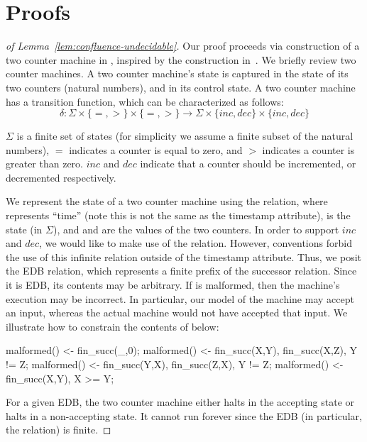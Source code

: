 \section{Proofs}
\begin{proof}[of Lemma~\ref{lem:confluence-undecidable}]
Our proof proceeds via construction of a two counter machine in \lang, inspired by the construction in~\cite{undecidable-datalog}. We briefly review two counter machines.  A two counter machine's state is captured in the state of its two counters (natural numbers), and in its control state.  A two counter machine has a transition function, which can be characterized as follows:
$$\delta: \Sigma \times \{=, >\} \times \{=, >\} \rightarrow \Sigma \times \{inc, dec\} \times \{inc, dec\}$$

$\Sigma$ is a finite set of states (for simplicity we assume a finite subset of the natural numbers), $=$ indicates a counter is equal to zero, and $>$ indicates a counter is greater than zero.  $inc$ and $dec$ indicate that a counter should be incremented, or decremented respectively.

We represent the state of a two counter machine using the  relation, where  represents ``time'' (note this is not the same as the timestamp attribute),  is the state (in $\Sigma$), and  and  are the values of the two counters.  In order to support $inc$ and $dec$, we would like to make use of the  relation.  However, \lang conventions forbid the use of this infinite relation outside of the timestamp attribute.  Thus, we posit the  EDB relation, which represents a finite prefix of the successor relation.  Since it is EDB, its contents may be arbitrary.  If  is malformed, then the machine's execution may be incorrect.  In particular, our model of the machine may accept an input, whereas the actual machine would not have accepted that input.  We illustrate how to constrain the contents of  below:

\begin{Dedalus}
malformed() <- fin_succ(_,0);
malformed() <- fin_succ(X,Y), fin_succ(X,Z), Y != Z;
malformed() <- fin_succ(Y,X), fin_succ(Z,X), Y != Z;
malformed() <- fin_succ(X,Y), X >= Y;
\end{Dedalus}

For a given EDB, the two counter machine either halts in the accepting state or halts in a non-accepting state.  It cannot run forever since the EDB (in particular, the  relation) is finite.


\end{proof}

